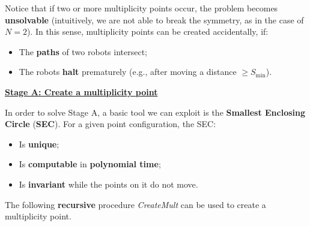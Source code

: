 Notice that if two or more multiplicity points occur, the problem becomes \textbf{unsolvable} (intuitively, we are not able to break the symmetry, as in the case of $N = 2$). In this sense, multiplicity points can be created accidentally, if:
\begin{itemize}
    \item The \textbf{paths} of two robots intersect;
    \item The robots \textbf{halt} prematurely (e.g., after moving a distance $\geq S_{\text{min}}$).
\end{itemize}

\textbf{\underline{Stage A: Create a multiplicity point}}

In order to solve Stage A, a basic tool we can exploit is the \textbf{Smallest Enclosing Circle} (\textbf{SEC}). For a given point configuration, the SEC:
\begin{itemize}
    \item Is \textbf{unique};
    \item Is \textbf{computable} in \textbf{polynomial time};
    \item Is \textbf{invariant} while the points on it do not move.
\end{itemize}


The following \textbf{recursive} procedure \textit{CreateMult} can be used to create a multiplicity point.

